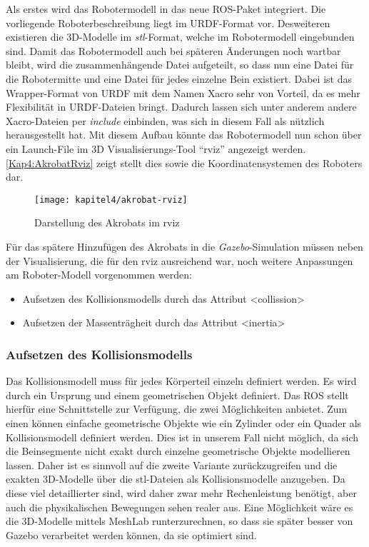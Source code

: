 \begin{itemize}
Als erstes wird das Robotermodell in das neue \ac{ROS}-Paket integriert. Die vorliegende Roboterbeschreibung liegt im \ac{URDF}-Format vor. Desweiteren existieren die 3D-Modelle im \emph{stl}-Format, welche im Robotermodell eingebunden sind. Damit das Robotermodell auch bei späteren Änderungen noch wartbar bleibt, wird die zusammenhängende Datei aufgeteilt, so dass nun eine Datei für die Robotermitte und eine Datei für jedes einzelne Bein existiert. Dabei ist das Wrapper-Format von \ac{URDF} mit dem Namen \ac{Xacro} sehr von Vorteil, da es mehr Flexibilität in \ac{URDF}-Dateien bringt. Dadurch lassen sich unter anderem andere \ac{Xacro}-Dateien per \emph{include} einbinden, was sich in diesem Fall als nützlich herausgestellt hat. Mit diesem Aufbau könnte das Robotermodell nun schon über ein Launch-File im 3D Visualisierungs-Tool "`rviz"' angezeigt werden. \autoref{Kap4:AkrobatRviz} zeigt stellt dies sowie die Koordinatensystemen des Roboters dar.

\begin{figure}[b!]
  \centering
  \texttt{[image: kapitel4/akrobat-rviz]}
  \caption{Darstellung des Akrobats im rviz}
  \label{Kap4:AkrobatRviz}
\end{figure}

Für das spätere Hinzufügen des Akrobats in die \emph{Gazebo}-Simulation müssen neben der Visualisierung, die für den rviz ausreichend war, noch weitere Anpassungen am Roboter-Modell vorgenommen werden:
\begin{itemize}
  \item Aufsetzen des Kollisionsmodells durch das Attribut <collission>
  \item Aufsetzen der Massenträgheit durch das Attribut <inertia>
\end{itemize}

\subsubsection{Aufsetzen des Kollisionsmodells}

Das Kollisionsmodell muss für jedes Körperteil einzeln definiert werden. Es wird durch ein Ursprung und einem geometrischen Objekt definiert. Das \ac{ROS} stellt hierfür eine Schnittstelle zur Verfügung, die zwei Möglichkeiten anbietet. Zum einen können einfache geometrische Objekte wie ein Zylinder oder ein Quader als Kollisionsmodell definiert werden. Dies ist in unserem Fall nicht möglich, da sich die Beinsegmente nicht exakt durch einzelne geometrische Objekte modellieren lassen. Daher ist es sinnvoll auf die zweite Variante zurückzugreifen und die exakten 3D-Modelle über die stl-Dateien als Kollisionsmodelle anzugeben. Da diese viel detaillierter sind, wird daher zwar mehr Rechenleistung benötigt, aber auch die physikalischen Bewegungen sehen realer aus. Eine Möglichkeit wäre es die 3D-Modelle mittels MeshLab runterzurechnen, so dass sie später besser von Gazebo verarbeitet werden können, da sie optimiert sind.


\end{itemize}
